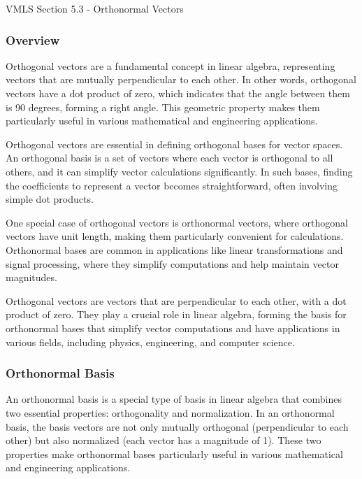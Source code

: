 \begin{notes}{VMLS Section 5.3 - Orthonormal Vectors}
    \subsubsection*{Overview}

    Orthogonal vectors are a fundamental concept in linear algebra, representing vectors that are mutually perpendicular to each other. In other words, orthogonal vectors have a dot product of zero, 
    which indicates that the angle between them is 90 degrees, forming a right angle. This geometric property makes them particularly useful in various mathematical and engineering applications.

    Orthogonal vectors are essential in defining orthogonal bases for vector spaces. An orthogonal basis is a set of vectors where each vector is orthogonal to all others, and it can simplify vector 
    calculations significantly. In such bases, finding the coefficients to represent a vector becomes straightforward, often involving simple dot products.

    One special case of orthogonal vectors is orthonormal vectors, where orthogonal vectors have unit length, making them particularly convenient for calculations. Orthonormal bases are common in 
    applications like linear transformations and signal processing, where they simplify computations and help maintain vector magnitudes.

    Orthogonal vectors are vectors that are perpendicular to each other, with a dot product of zero. They play a crucial role in linear algebra, forming the basis for orthonormal bases that simplify 
    vector computations and have applications in various fields, including physics, engineering, and computer science.

    \subsubsection*{Orthonormal Basis}

    An orthonormal basis is a special type of basis in linear algebra that combines two essential properties: orthogonality and normalization. In an orthonormal basis, the basis vectors are not only 
    mutually orthogonal (perpendicular to each other) but also normalized (each vector has a magnitude of 1). These two properties make orthonormal bases particularly useful in various mathematical 
    and engineering applications.


\end{notes}
